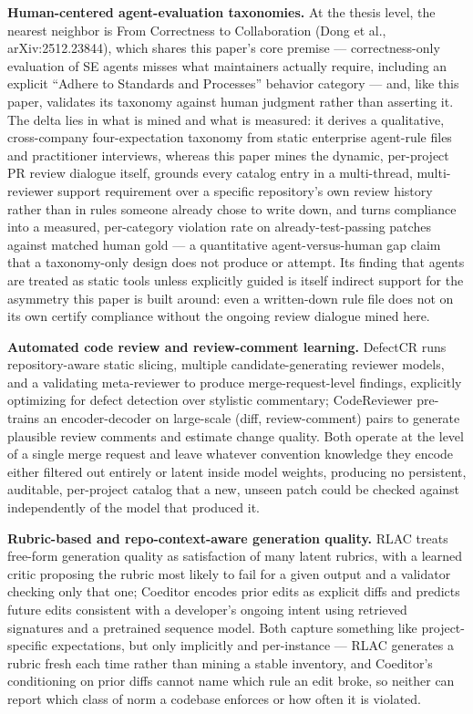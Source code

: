 \documentclass[11pt]{article}
\begin{document}
\textbf{Human-centered agent-evaluation taxonomies.} At the thesis level, the nearest neighbor is From Correctness to Collaboration (Dong et al., arXiv:2512.23844), which shares this paper's core premise --- correctness-only evaluation of SE agents misses what maintainers actually require, including an explicit ``Adhere to Standards and Processes'' behavior category --- and, like this paper, validates its taxonomy against human judgment rather than asserting it. The delta lies in what is mined and what is measured: it derives a qualitative, cross-company four-expectation taxonomy from static enterprise agent-rule files and practitioner interviews, whereas this paper mines the dynamic, per-project PR review dialogue itself, grounds every catalog entry in a multi-thread, multi-reviewer support requirement over a specific repository's own review history rather than in rules someone already chose to write down, and turns compliance into a measured, per-category violation rate on already-test-passing patches against matched human gold --- a quantitative agent-versus-human gap claim that a taxonomy-only design does not produce or attempt. Its finding that agents are treated as static tools unless explicitly guided is itself indirect support for the asymmetry this paper is built around: even a written-down rule file does not on its own certify compliance without the ongoing review dialogue mined here.

\textbf{Automated code review and review-comment learning.} DefectCR runs repository-aware static slicing, multiple candidate-generating reviewer models, and a validating meta-reviewer to produce merge-request-level findings, explicitly optimizing for defect detection over stylistic commentary; CodeReviewer pre-trains an encoder-decoder on large-scale (diff, review-comment) pairs to generate plausible review comments and estimate change quality. Both operate at the level of a single merge request and leave whatever convention knowledge they encode either filtered out entirely or latent inside model weights, producing no persistent, auditable, per-project catalog that a new, unseen patch could be checked against independently of the model that produced it.

\textbf{Rubric-based and repo-context-aware generation quality.} RLAC treats free-form generation quality as satisfaction of many latent rubrics, with a learned critic proposing the rubric most likely to fail for a given output and a validator checking only that one; Coeditor encodes prior edits as explicit diffs and predicts future edits consistent with a developer's ongoing intent using retrieved signatures and a pretrained sequence model. Both capture something like project-specific expectations, but only implicitly and per-instance --- RLAC generates a rubric fresh each time rather than mining a stable inventory, and Coeditor's conditioning on prior diffs cannot name which rule an edit broke, so neither can report which class of norm a codebase enforces or how often it is violated.
\end{document}
